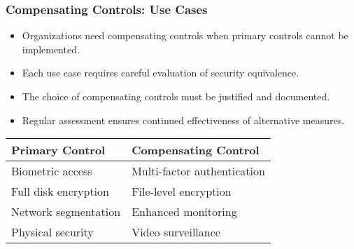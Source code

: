 \documentclass{beamer}
\begin{document}
\begin{frame}
    \frametitle{Compensating Controls: Use Cases}
    
    \begin{itemize}
        \item Organizations need compensating controls when primary controls cannot be implemented.
        
        \item Each use case requires careful evaluation of security equivalence.
        
        \item The choice of compensating controls must be justified and documented.
        
        \item Regular assessment ensures continued effectiveness of alternative measures.
    \end{itemize}
    
    \begin{table}
        \begin{tabular}{|l|l|}
            \hline
            \textbf{Primary Control} & \textbf{Compensating Control} \\
            \hline
            Biometric access & Multi-factor authentication \\
            Full disk encryption & File-level encryption \\
            Network segmentation & Enhanced monitoring \\
            Physical security & Video surveillance \\
            \hline
        \end{tabular}
    \end{table}
\end{frame}
\end{document}
